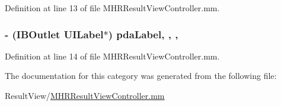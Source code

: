 Definition at line 13 of file M\+H\+R\+Result\+View\+Controller.\+mm.

\hypertarget{category_m_h_r_result_view_controller_07_08_a4d91971b1a4e42c64a1c0d2790b1fe53}{
\subsubsection[{pda\+Label}]{\setlength{\rightskip}{0pt plus 5cm}-\/ (I\+B\+Outlet U\+I\+Label$\ast$) pda\+Label\hspace{0.3cm}{\ttfamily [read]}, {\ttfamily [write]}, {\ttfamily [nonatomic]}, {\ttfamily [weak]}}}\label{category_m_h_r_result_view_controller_07_08_a4d91971b1a4e42c64a1c0d2790b1fe53}


Definition at line 14 of file M\+H\+R\+Result\+View\+Controller.\+mm.



The documentation for this category was generated from the following file\+:\begin{DoxyCompactItemize}
\item 
Result\+View/\hyperlink{_m_h_r_result_view_controller_8mm}{M\+H\+R\+Result\+View\+Controller.\+mm}\end{DoxyCompactItemize}

